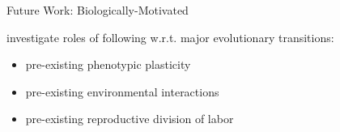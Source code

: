 \begin{frame}{Future Work: Biologically-Motivated}

investigate roles of following w.r.t. major evolutionary transitions:
\pause
\begin{itemize}[<+->]
\item  pre-existing phenotypic plasticity \cite{clune2007investigating, lalejini2016evolutionary}
\item pre-existing environmental interactions
\item pre-existing reproductive division of labor
\end{itemize}

\end{frame}
